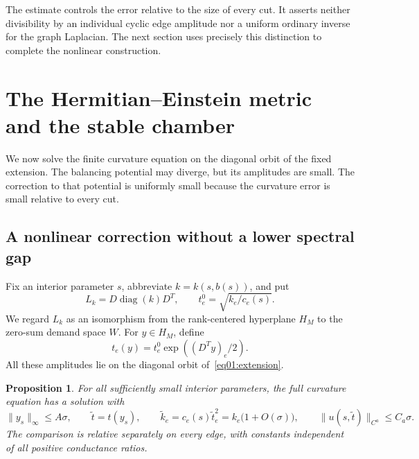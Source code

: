 \documentclass[11pt]{amsart}
\newtheorem{proposition}[theorem]{Proposition}
\theoremstyle{definition}
\theoremstyle{remark}
\newcommand{\diag}{\operatorname{diag}}
\begin{document}
The estimate controls the error relative to the size of every cut.
It asserts neither divisibility by an individual cyclic edge
amplitude nor a uniform ordinary inverse for the graph Laplacian.
The next section uses precisely this distinction to complete the
nonlinear construction.

\section{The Hermitian--Einstein metric and the stable chamber}
\label{sec04:calibration}

We now solve the finite curvature equation on the diagonal orbit of
the fixed extension. The balancing potential may diverge, but its
amplitudes are small. The correction to that potential is uniformly
small because the curvature error is small relative to every cut.

\subsection{A nonlinear correction without a lower spectral gap}

Fix an interior parameter \(s\), abbreviate \(k=k(s,b(s))\),
and put
\[
 L_k=D\diag(k)D^T,\qquad t_e^0=\sqrt{k_e/c_e(s)}.
\]
We regard \(L_k\) as an isomorphism from the rank-centered
hyperplane \(H_M\) to the zero-sum demand space \(W\).
For \(y\in H_M\), define
\begin{equation}\label{eq04:perturbedamplitudes}
 t_e(y)=t_e^0\exp((D^Ty)_e/2).
\end{equation}
All these amplitudes lie on the diagonal orbit
of~\eqref{eq01:extension}.

\begin{proposition}\label{prop04:calibration}
For all sufficiently small interior parameters, the full curvature
equation has a solution with
\begin{equation}\label{eq04:calibration}
 \|y_s\|_\infty\leq A\sigma,\qquad
 \widetilde t=t(y_s),\qquad
 \widetilde k_e=c_e(s)\widetilde t_e^2
                 =k_e\bigl(1+O(\sigma)\bigr),\qquad
 \|u(s,\widetilde t)\|_{C^a}\leq C_a\sigma.
\end{equation}
The comparison is relative separately on every edge, with constants
independent of all positive conductance ratios.
\end{proposition}
\end{document}
